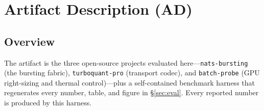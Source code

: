 \documentclass[conference]{IEEEtran}
\begin{document}
\appendices
\section{Artifact Description (AD)}\label{sec:ad}

\subsection{Overview}
The artifact is the three open-source projects evaluated here---\texttt{nats-bursting}
(the bursting fabric), \texttt{turboquant-pro} (transport codec), and \texttt{batch-probe}
(GPU right-sizing and thermal control)---plus a self-contained benchmark harness that
regenerates every number, table, and figure in \S\ref{sec:eval}. Every reported number is
produced by this harness.
\end{document}
